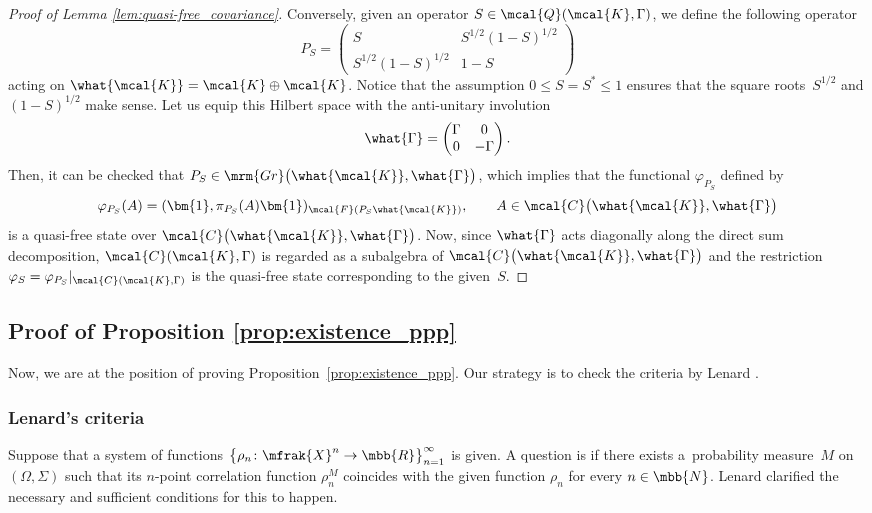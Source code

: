 \begin{proof}[Proof of Lemma \ref{lem:quasi-free_covariance}]
Conversely, given an operator $S\in\mcal{Q}(\mcal{K},\Gamma)$, we define the following operator
\begin{equation*}
	P_{S}=\left(
	\begin{matrix}
	S & S^{1/2}(1-S)^{1/2} \\
	S^{1/2}(1-S)^{1/2} & 1-S
	\end{matrix}
	\right)
\end{equation*}
acting on $\what{\mcal{K}}=\mcal{K}\oplus\mcal{K}$. Notice that the assumption $0\le S=S^{\ast}\le 1$ ensures that the square roots~$S^{1/2}$ and $(1-S)^{1/2}$ make sense. Let us equip this Hilbert space with the anti-unitary involution
\begin{equation*}
	\what{\Gamma}=\left(
	\begin{matrix}
	\Gamma & 0 \\
	0 & -\Gamma
	\end{matrix}
	\right).
\end{equation*}
Then, it can be checked that $P_{S}\in \mrm{Gr}\big(\what{\mcal{K}},\what{\Gamma}\big)$, which implies that the functional $\varphi_{P_{S}}$ defined by
\begin{equation*}
	\varphi_{P_{S}}(A)= (\bm{1},\pi_{P_{S}}(A)\bm{1} )_{\mcal{F}(P_{S}\what{\mcal{K}})},\qquad A\in \mcal{C}\big(\what{\mcal{K}},\what{\Gamma}\big)
\end{equation*}
is a quasi-free state over $\mcal{C}\big(\what{\mcal{K}},\what{\Gamma}\big)$. Now, since $\what{\Gamma}$ acts diagonally along the direct sum decomposition, $\mcal{C}(\mcal{K},\Gamma)$ is regarded as a subalgebra of $\mcal{C}\big(\what{\mcal{K}},\what{\Gamma}\big)$ and the restriction $\varphi_{S}=\varphi_{P_{S}}|_{\mcal{C}(\mcal{K},\Gamma)}$ is the quasi-free state corresponding to the given~$S$.
\end{proof}

\subsection{Proof of Proposition \ref{prop:existence_ppp}}
Now, we are at the position of proving Proposition~\ref{prop:existence_ppp}.
Our strategy is to check the criteria by Lenard \cite{Lenard1975a, Lenard1975b}.

\subsubsection{Lenard's criteria}
Suppose that a system of functions $\big\{\rho_{n}\colon\mfrak{X}^{n}\to\mbb{R}\big\}_{n=1}^{\infty}$ is given.
A question is if there exists a~probability measure~$M$ on $(\Omega,\Sigma)$ such that its $n$-point correlation function $\rho^{M}_{n}$ coincides with the given function $\rho_{n}$ for every $n\in\mbb{N}$.
Lenard \cite{Lenard1975a, Lenard1975b} clarified the necessary and sufficient conditions for this to happen.

